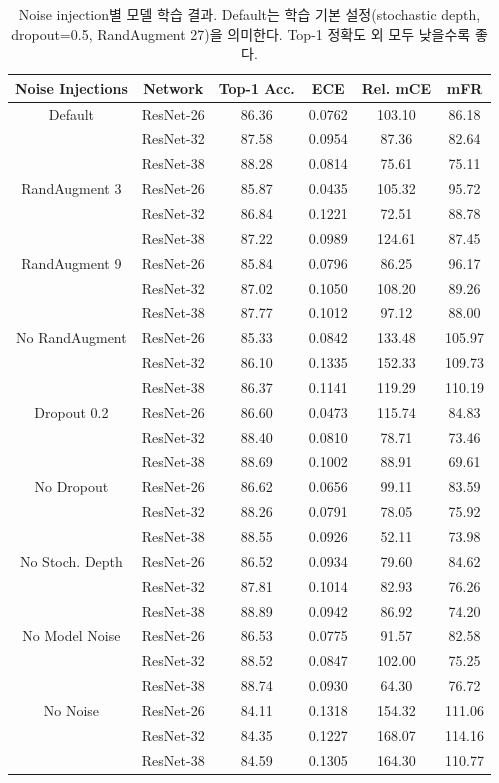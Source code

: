 \documentclass[a4paper, 10pt]{article}
\begin{document}
\begin{table}[!h]
  \center 
  \begin{tabular}{|c|c|c|c|c|c|}
    \hline
      Noise Injections & Network & Top-1 Acc. & ECE & Rel. mCE & mFR \\ \hline
      Default & ResNet-26 & 86.36 & 0.0762 & 103.10 & 86.18 \\
       & ResNet-32 & 87.58 & 0.0954 & 87.36 & 82.64 \\
       & ResNet-38 & 88.28 & 0.0814 & 75.61 & 75.11 \\ \hline
      RandAugment 3 & ResNet-26 & 85.87 & 0.0435 & 105.32 & 95.72 \\
       & ResNet-32 & 86.84 & 0.1221 & 72.51 & 88.78 \\
       & ResNet-38 & 87.22 & 0.0989 & 124.61 & 87.45 \\ \hline
      RandAugment 9 & ResNet-26 & 85.84 & 0.0796 & 86.25 & 96.17 \\
       & ResNet-32 & 87.02 & 0.1050 & 108.20 & 89.26 \\
       & ResNet-38 & 87.77 & 0.1012 & 97.12 & 88.00 \\ \hline
      No RandAugment & ResNet-26 & 85.33 & 0.0842 & 133.48 & 105.97 \\
       & ResNet-32 & 86.10 & 0.1335 & 152.33 & 109.73 \\
       & ResNet-38 & 86.37 & 0.1141 & 119.29 & 110.19 \\ \hline
      Dropout 0.2 & ResNet-26 & 86.60 & 0.0473 & 115.74 & 84.83 \\
       & ResNet-32 & 88.40 & 0.0810 & 78.71 & 73.46 \\
       & ResNet-38 & 88.69 & 0.1002 & 88.91 & 69.61 \\ \hline
      No Dropout & ResNet-26 & 86.62 & 0.0656 & 99.11 & 83.59 \\
       & ResNet-32 & 88.26 & 0.0791 & 78.05 & 75.92 \\
       & ResNet-38 & 88.55 & 0.0926 & 52.11 & 73.98 \\ \hline
      No Stoch. Depth & ResNet-26 & 86.52 & 0.0934 & 79.60 & 84.62 \\
       & ResNet-32 & 87.81 & 0.1014 & 82.93 & 76.26 \\
       & ResNet-38 & 88.89 & 0.0942 & 86.92 & 74.20 \\ \hline
      No Model Noise & ResNet-26 & 86.53 & 0.0775 & 91.57 & 82.58 \\
       & ResNet-32 & 88.52 & 0.0847 & 102.00 & 75.25 \\
       & ResNet-38 & 88.74 & 0.0930 & 64.30 & 76.72 \\ \hline
      No Noise & ResNet-26 & 84.11 & 0.1318 & 154.32 & 111.06 \\
       & ResNet-32 & 84.35 & 0.1227 & 168.07 & 114.16 \\
       & ResNet-38 & 84.59 & 0.1305 & 164.30 & 110.77 \\ \hline
  \end{tabular}
  \caption{Noise injection별 모델 학습 결과. Default는 학습 기본 설정(stochastic depth, dropout=0.5, RandAugment 27)을 의미한다. Top-1 정확도 외 모두 낮을수록 좋다.}
  \label{ablation_noise}
\end{table}
\end{document}
